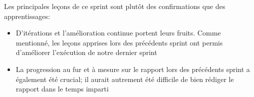Les principales leçons de ce sprint sont plutôt des confirmations que des apprentissages:
\begin{itemize}
    \item D'itérations et l'amélioration continue portent leurs fruits. Comme mentionné, les leçons apprises lors des précédents sprint 
    ont permis d'améliorer l'exécution de notre dernier sprint
    \item La progression au fur et à mesure sur le rapport lors des précédents sprint a également été crucial; il aurait autrement été 
    difficile de bien rédiger le rapport dans le temps imparti
\end{itemize}

